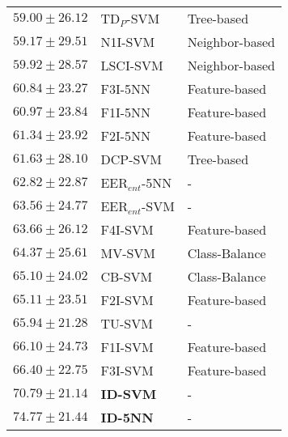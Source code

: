 \begin{tabular}{lll}
$59.00\pm26.12$ & TD$_P$-SVM & Tree-based \\
$59.17\pm29.51$ & N1I-SVM & Neighbor-based \\
$59.92\pm28.57$ & LSCI-SVM & Neighbor-based \\
$60.84\pm23.27$ & F3I-5NN & Feature-based \\
$60.97\pm23.84$ & F1I-5NN & Feature-based \\
$61.34\pm23.92$ & F2I-5NN & Feature-based \\
$61.63\pm28.10$ & DCP-SVM & Tree-based \\
$62.82\pm22.87$ & EER$_{ent}$-5NN & - \\
$63.56\pm24.77$ & EER$_{ent}$-SVM & - \\
$63.66\pm26.12$ & F4I-SVM & Feature-based \\
$64.37\pm25.61$ & MV-SVM & Class-Balance \\
$65.10\pm24.02$ & CB-SVM & Class-Balance \\
$65.11\pm23.51$ & F2I-SVM & Feature-based \\
$65.94\pm21.28$ & TU-SVM & - \\
$66.10\pm24.73$ & F1I-SVM & Feature-based \\
$66.40\pm22.75$ & F3I-SVM & Feature-based \\
$70.79\pm21.14$ & \textbf{ID-SVM} & - \\
$74.77\pm21.44$ & \textbf{ID-5NN} & - \\
\bottomrule
\end{tabular}
